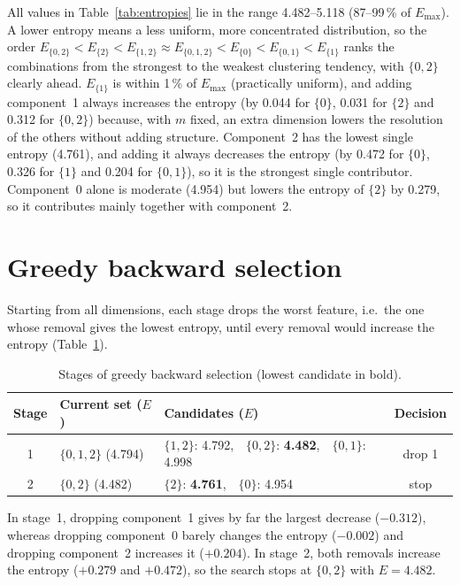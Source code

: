 \documentclass[a4paper,12pt]{article}
\begin{document}
All values in Table~\ref{tab:entropies} lie in the range 4.482--5.118
(87--99\,\% of $E_{\max}$). A lower entropy means a less uniform, more
concentrated distribution, so the order $E_{\{0,2\}}<E_{\{2\}}<E_{\{1,2\}}
\approx E_{\{0,1,2\}}<E_{\{0\}}<E_{\{0,1\}}<E_{\{1\}}$ ranks the
combinations from the strongest to the weakest clustering tendency, with
$\{0,2\}$ clearly ahead. $E_{\{1\}}$ is within 1\,\% of
$E_{\max}$ (practically uniform), and adding component~1 always increases
the entropy (by 0.044 for $\{0\}$, 0.031 for $\{2\}$ and 0.312 for
$\{0,2\}$) because, with $m$ fixed, an extra dimension lowers the
resolution of the others without adding structure. Component~2 has the
lowest single entropy (4.761), and adding it always decreases the entropy
(by 0.472 for $\{0\}$, 0.326 for $\{1\}$ and 0.204 for $\{0,1\}$), so it is
the strongest single contributor. Component~0 alone is moderate (4.954) but
lowers the entropy of $\{2\}$ by 0.279, so it contributes mainly together
with component~2.

\section{Greedy backward selection}

Starting from all dimensions, each stage drops the worst feature, i.e.\ the
one whose removal gives the lowest entropy, until every removal would
increase the entropy (Table~\ref{tab:backward}).

\begin{table}[!ht]
\centering
\caption{Stages of greedy backward selection (lowest candidate in bold).}
\label{tab:backward}
\begin{tabular}{cllc}
\toprule
Stage & Current set ($E$) & Candidates ($E$) & Decision \\
\midrule
1 & $\{0,1,2\}$ (4.794) & $\{1,2\}$: 4.792,\ \ $\{0,2\}$: \textbf{4.482},\ \ $\{0,1\}$: 4.998 & drop 1 \\
2 & $\{0,2\}$ (4.482) & $\{2\}$: \textbf{4.761},\ \ $\{0\}$: 4.954 & stop \\
\bottomrule
\end{tabular}
\end{table}

In stage~1, dropping component~1 gives by far the largest decrease
($-0.312$), whereas dropping component~0 barely changes the entropy
($-0.002$) and dropping component~2 increases it ($+0.204$). In stage~2,
both removals increase the entropy ($+0.279$ and $+0.472$), so the search
stops at $\{0,2\}$ with $E=4.482$.
\end{document}
